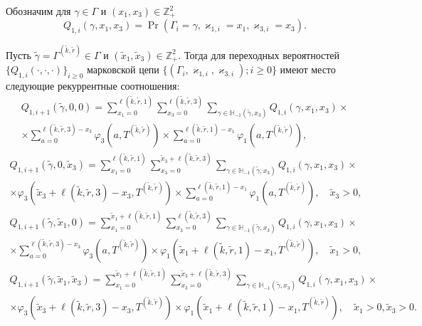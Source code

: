 \documentclass[a4paper,12pt,russian]{extarticle}
\begin{document}
Обозначим для $\gamma \in \Gamma$ и $(x_1,x_3) \in {\mathbb Z}_+^2$
\begin{equation}
Q_{1,i}(\gamma,x_1,x_3) = \Pr(\Gamma_{i}=\gamma, \varkappa_{1,i}=x_1, \varkappa_{3,i}=x_3).
\end{equation}

\begin{theorem}
Пусть $\tilde{\gamma} =\Gamma^{(\tilde{k},\tilde{r})}\in \Gamma$ и $(\tilde{x}_1, \tilde{x}_3) \in {\mathbb Z}_+^2$. Тогда для переходных вероятностей $\{Q_{1,i}(\cdot,\cdot,\cdot)\}_{i\geqslant 0}$ марковской цепи $\{(\Gamma_i, \varkappa_{1,i},\varkappa_{3,i}); i \geqslant 0\} $ имеют место следующие рекуррентные соотношения:
\begin{multline*}
Q_{1,i+1}(\tilde{\gamma},0, 0)= 
\sum_{x_1=0}^{\ell(\tilde{k},\tilde{r},1)} \sum_{x_3=0}^{\ell(\tilde{k},\tilde{r},3)} \sum_{\gamma \in {\mathbb H}_{-1}(\tilde{\gamma},x_3)}Q_{1,i}(\gamma,x_1, x_3)\times \\ \times
\sum_{a=0}^{\ell(\tilde{k},\tilde{r},3)-x_3}\varphi_3(a,T^{(\tilde{k},\tilde{r})}) \times \sum_{a=0}^{\ell(\tilde{k},\tilde{r},1)-x_1}\varphi_1(a,T^{(\tilde{k},\tilde{r})}),
\end{multline*}
\begin{multline*}
Q_{1,i+1}(\tilde{\gamma},0, \tilde{x}_3)= 
\sum_{x_1=0}^{\ell(\tilde{k},\tilde{r},1)} \sum_{x_3=0}^{\tilde{x}_3 + \ell(\tilde{k},\tilde{r},3)} \sum_{\gamma \in {\mathbb H}_{-1}(\tilde{\gamma},x_3)}Q_{1,i}(\gamma,x_1, x_3) \times  \\ \times \varphi_3(\tilde{x}_3 + \ell(\tilde{k},\tilde{r},3) - x_3,T^{(\tilde{k},\tilde{r})})  \times \sum_{a=0}^{\ell(\tilde{k},\tilde{r},1)-x_1}\varphi_1(a,T^{(\tilde{k},\tilde{r})}), \quad \tilde{x}_3 > 0,
\end{multline*}
\begin{multline*}
Q_{1,i+1}(\tilde{\gamma},\tilde{x}_1, 0)= 
\sum_{x_1=0}^{\tilde{x}_1 + \ell(\tilde{k},\tilde{r},1) } \sum_{x_3=0}^{\ell(\tilde{k},\tilde{r},3)} \sum_{\gamma \in {\mathbb H}_{-1}(\tilde{\gamma},x_3)}Q_{1,i}(\gamma,x_1, x_3) \times  \\ \times \sum_{a=0}^{\ell(\tilde{k},\tilde{r},3)-x_3}\varphi_3(a,T^{(\tilde{k},\tilde{r})}) \times \varphi_1(\tilde{x}_1 + \ell(\tilde{k},\tilde{r},1) - x_1,T^{(\tilde{k},\tilde{r})}), \quad \tilde{x}_1 > 0,
\end{multline*}
\begin{multline*}
Q_{1,i+1}(\tilde{\gamma},\tilde{x}_1, \tilde{x}_3)= 
\sum_{x_1=0}^{\tilde{x}_1 +\ell(\tilde{k},\tilde{r},1)} \sum_{x_3=0}^{\tilde{x}_3 +\ell(\tilde{k},\tilde{r},3)} \sum_{\gamma \in {\mathbb H}_{-1}(\tilde{\gamma},x_3)}Q_{1,i}(\gamma,x_1, x_3) \times  \\ \times \varphi_3(\tilde{x}_3 + \ell(\tilde{k},\tilde{r},3) - x_3,T^{(\tilde{k},\tilde{r})})  \times \varphi_1(\tilde{x}_1 + \ell(\tilde{k},\tilde{r},1)-x_1,T^{(\tilde{k},\tilde{r})}), \quad \tilde{x}_1 > 0, \tilde{x}_3 > 0.
\end{multline*}
\label{prob:rek:1}
\end{theorem}
\end{document}
